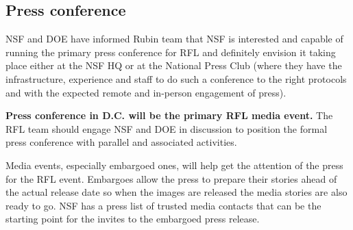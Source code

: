 \subsection{Press conference}

NSF and DOE have informed Rubin team that NSF is interested and capable of running the primary press
conference for RFL  and definitely envision it taking place either at the NSF HQ or at the National Press Club
(where they have the infrastructure, experience and staff to do such a conference to the right protocols and
with the expected remote and in-person engagement of press).

{\bf Press conference in D.C. will be the primary RFL media event.}
The RFL team should engage NSF and DOE in discussion to position the
formal press conference with parallel and associated activities.

Media events, especially embargoed ones, will help get the attention of the press for the RFL event.
Embargoes allow the press to prepare their stories ahead of the actual release date so when the images
are released the media stories are also ready to go. NSF has a press list of trusted media contacts that
can be the starting point for the invites to the embargoed press release. 

